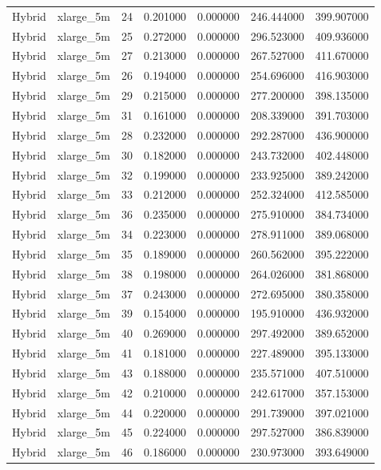\begin{tabular}{llrrrrr}
Hybrid & xlarge_5m & 24 & 0.201000 & 0.000000 & 246.444000 & 399.907000 \\
Hybrid & xlarge_5m & 25 & 0.272000 & 0.000000 & 296.523000 & 409.936000 \\
Hybrid & xlarge_5m & 27 & 0.213000 & 0.000000 & 267.527000 & 411.670000 \\
Hybrid & xlarge_5m & 26 & 0.194000 & 0.000000 & 254.696000 & 416.903000 \\
Hybrid & xlarge_5m & 29 & 0.215000 & 0.000000 & 277.200000 & 398.135000 \\
Hybrid & xlarge_5m & 31 & 0.161000 & 0.000000 & 208.339000 & 391.703000 \\
Hybrid & xlarge_5m & 28 & 0.232000 & 0.000000 & 292.287000 & 436.900000 \\
Hybrid & xlarge_5m & 30 & 0.182000 & 0.000000 & 243.732000 & 402.448000 \\
Hybrid & xlarge_5m & 32 & 0.199000 & 0.000000 & 233.925000 & 389.242000 \\
Hybrid & xlarge_5m & 33 & 0.212000 & 0.000000 & 252.324000 & 412.585000 \\
Hybrid & xlarge_5m & 36 & 0.235000 & 0.000000 & 275.910000 & 384.734000 \\
Hybrid & xlarge_5m & 34 & 0.223000 & 0.000000 & 278.911000 & 389.068000 \\
Hybrid & xlarge_5m & 35 & 0.189000 & 0.000000 & 260.562000 & 395.222000 \\
Hybrid & xlarge_5m & 38 & 0.198000 & 0.000000 & 264.026000 & 381.868000 \\
Hybrid & xlarge_5m & 37 & 0.243000 & 0.000000 & 272.695000 & 380.358000 \\
Hybrid & xlarge_5m & 39 & 0.154000 & 0.000000 & 195.910000 & 436.932000 \\
Hybrid & xlarge_5m & 40 & 0.269000 & 0.000000 & 297.492000 & 389.652000 \\
Hybrid & xlarge_5m & 41 & 0.181000 & 0.000000 & 227.489000 & 395.133000 \\
Hybrid & xlarge_5m & 43 & 0.188000 & 0.000000 & 235.571000 & 407.510000 \\
Hybrid & xlarge_5m & 42 & 0.210000 & 0.000000 & 242.617000 & 357.153000 \\
Hybrid & xlarge_5m & 44 & 0.220000 & 0.000000 & 291.739000 & 397.021000 \\
Hybrid & xlarge_5m & 45 & 0.224000 & 0.000000 & 297.527000 & 386.839000 \\
Hybrid & xlarge_5m & 46 & 0.186000 & 0.000000 & 230.973000 & 393.649000 \\

\end{tabular}
